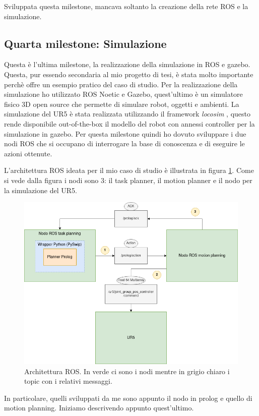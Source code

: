 Sviluppata questa milestone, mancava soltanto la creazione della rete ROS e la simulazione. 


\subsection{Quarta milestone: Simulazione}
\label{subsec:simulation}
Questa è l'ultima milestone, la realizzazione della simulazione in ROS e gazebo. Questa, pur essendo secondaria al mio progetto di tesi, è stata molto importante perchè offre un esempio pratico del caso di studio.
Per la realizzazione della simulazione ho utilizzato ROS Noetic e Gazebo, quest'ultimo è un simulatore fisico 3D open source che permette di simulare robot, oggetti e ambienti.
La simulazione del UR5 è stata realizzata utilizzando il framework \textit{locosim} \cite{focchi2023locosim}, questo rende disponibile out-of-the-box il modello del robot con annessi controller per la simulazione in gazebo.
Per questa milestone quindi ho dovuto sviluppare i due nodi ROS che si occupano di interrogare la base di conoscenza e di eseguire le azioni ottenute.

L'architettura ROS ideata per il mio caso di studio è illustrata in figura \ref{fig:archros}. Come si vede dalla figura i nodi sono 3: il task planner, il motion planner e il nodo per la simulazione del UR5. 
\begin{figure}[t]
    \centering
    \includegraphics[scale=0.5]{images/ArchROS.drawio.png}
    \caption{Architettura ROS. In verde ci sono i nodi mentre in grigio chiaro i topic con i relativi messaggi.}
    \label{fig:archros}
\end{figure}
In particolare, quelli sviluppati da me sono appunto il nodo in prolog e quello di motion planning. Iniziamo descrivendo appunto quest'ultimo.

